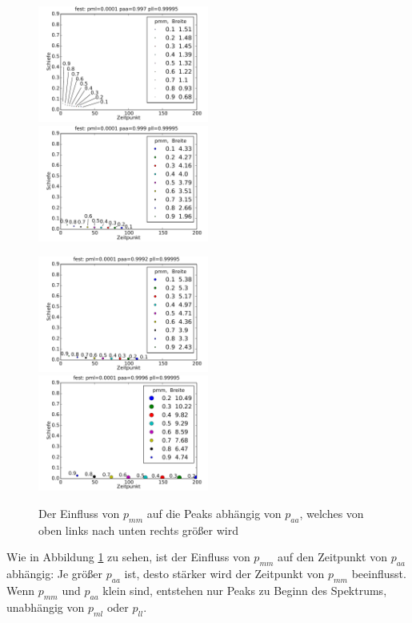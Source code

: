\begin{figure}[h]
\includegraphics[width=0.5\textwidth]{bilder/pmm/3fest_p_00001_0997_099995}
\includegraphics[width=0.5\textwidth]{bilder/pmm/3fest_p_00001_0999_099995}

\includegraphics[width=0.5\textwidth]{bilder/pmm/3fest_p_00001_09992_099995}
\includegraphics[width=0.5\textwidth]{bilder/pmm/3fest_p_00001_09996_099995}
\caption[Der Einfluss von $p_{mm}$ auf die Peaks abhängig von $p_{aa}$]{Der Einfluss von $p_{mm}$ auf die Peaks abhängig von $p_{aa}$, welches von oben links nach unten rechts größer wird}
\label{einfluss_pmm_1}
\end{figure}

Wie in Abbildung \ref{einfluss_pmm_1} zu sehen, ist der Einfluss von $p_{mm}$ auf den Zeitpunkt von $p_{aa}$ abhängig: Je größer $p_{aa}$ ist, desto stärker wird der Zeitpunkt von $p_{mm}$ beeinflusst. Wenn $p_{mm}$ und $p_{aa}$ klein sind, entstehen nur Peaks zu Beginn des Spektrums, unabhängig von $p_{ml}$ oder $p_{ll}$.

